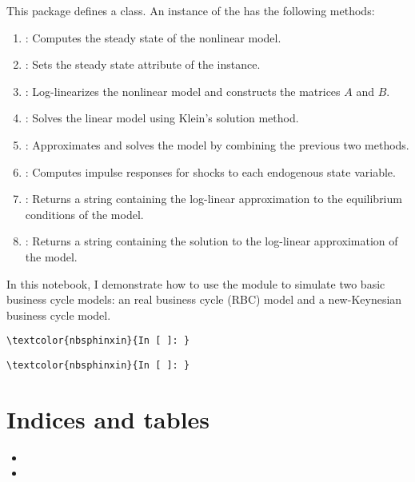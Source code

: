 \documentclass[letterpaper,10pt,openany,oneside,english]{sphinxmanual}
\begin{document}
This package defines a  class. An instance of the  has the following methods:
\begin{enumerate}
\item {} 
: Computes the steady state of the nonlinear model.

\item {} 
: Sets the steady state  attribute of the instance.

\item {} 
: Log-linearizes the nonlinear model and constructs the matrices \(A\) and \(B\).

\item {} 
: Solves the linear model using Klein's solution method.

\item {} 
: Approximates and solves the model by combining the previous two methods.

\item {} 
: Computes impulse responses for shocks to each endogenous state variable.

\item {} 
: Returns a string containing the log-linear approximation to the equilibrium conditions of the model.

\item {} 
: Returns a string containing the solution to the log-linear approximation of the model.

\end{enumerate}

In this notebook, I demonstrate how to use the module to simulate two basic business cycle models: an real business cycle (RBC) model and a new-Keynesian business cycle model.

\begin{Verbatim}[commandchars=\\\{\}]
\textcolor{nbsphinxin}{In [ ]: }
\end{Verbatim}

\begin{Verbatim}[commandchars=\\\{\}]
\textcolor{nbsphinxin}{In [ ]: }
\end{Verbatim}


\chapter{Indices and tables}
\label{\detokenize{index:indices-and-tables}}\begin{itemize}
\item {} 

\item {} 

\end{itemize}



\renewcommand{\indexname}{Index}
\printindex
\end{document}
